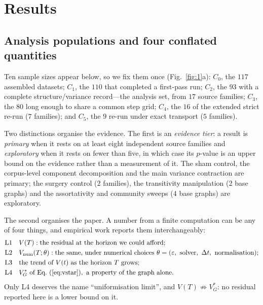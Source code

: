 \documentclass[11pt]{article}
\begin{document}
\section*{Results}

\subsection*{Analysis populations and four conflated quantities}

Ten sample sizes appear below, so we fix them once
(Fig.~\ref{fig:1}a): $C_0$, the $117$ assembled datasets; $C_1$, the $110$
that completed a first-pass run; $C_2$, the $93$ with a complete
structure/variance record---the analysis set, from $17$ source families; $C_3$,
the $80$ long enough to share a common step grid; $C_4$, the $16$ of the
extended strict re-run ($7$ families); and $C_5$, the $9$ re-run under exact
transport ($5$ families).

Two distinctions organise the evidence. The first is an
\emph{evidence tier}: a result is \emph{primary} when it rests on at least
eight independent source families and \emph{exploratory} when it rests on fewer
than five, in which case its $p$-value is an upper bound on the evidence rather
than a measurement of it. The sham control, the corpus-level component
decomposition and the main variance contraction are primary; the surgery
control ($2$ families), the transitivity manipulation ($2$ base graphs) and the
assortativity and community sweeps ($4$ base graphs) are exploratory.

The second organises the paper. A number from a finite
computation can be any of four things, and empirical work reports them
interchangeably:
\begin{align}
  \text{L1}&\quad V(T): \text{the residual at the horizon we could afford;}
  \nonumber\\
  \text{L2}&\quad V_{\mathrm{num}}(T;\theta): \text{the same, under numerical
  choices } \theta=(\varepsilon,\ \text{solver},\ \Delta t,\ \text{normalisation});
  \nonumber\\
  \text{L3}&\quad \text{the trend of } V(t) \text{ as the horizon } T \text{ grows;}
  \nonumber\\
  \text{L4}&\quad V_G^*\ \text{of Eq.}~(\ref{eq:vstar}),\ \text{a property of the
  graph alone.} \nonumber
\end{align}
Only L4 deserves the name ``uniformisation limit'', and $V(T)\not\Rightarrow
V_G^*$: no residual reported here is a lower bound on it. 
\end{document}
